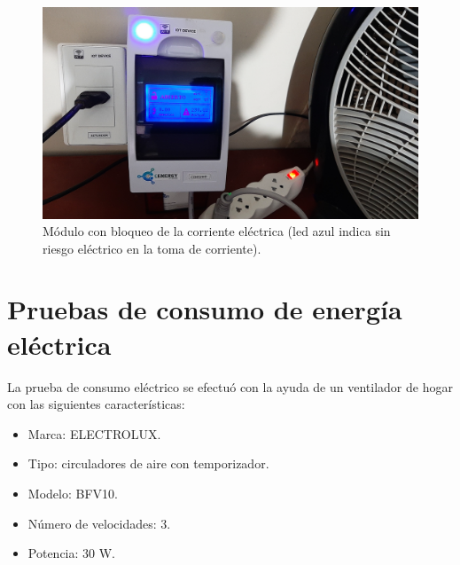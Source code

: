 \vspace{0.5cm}
\begin{figure}[htpb]
\centering 
\includegraphics[width=1.0\textwidth]{./Figures/test/consumo/bloqueo.png}
\caption{Módulo con bloqueo de la corriente eléctrica (led azul indica sin riesgo eléctrico en la toma de corriente).}
\label{fig:test-activa2}
\end{figure}

\vspace{0.5cm}
\section{Pruebas de consumo de energía eléctrica}

La prueba de consumo eléctrico se efectuó con la ayuda de un ventilador de hogar con las siguientes características:

\begin{itemize}
\item Marca: ELECTROLUX.
\item Tipo:	circuladores de aire con temporizador.
\item Modelo: BFV10.
\item Número de velocidades: 3.
\item Potencia: 30 W.
\end{itemize}



